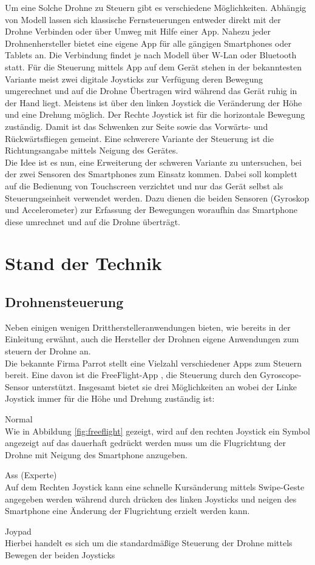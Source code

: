 \documentclass{article}
\begin{document}
Um eine Solche Drohne zu Steuern gibt es verschiedene Möglichkeiten. Abhängig von Modell lassen sich klassische Fernsteuerungen\cite{flypad} entweder direkt mit der Drohne Verbinden oder über Umweg mit Hilfe einer App. Nahezu jeder Drohnenhersteller bietet eine eigene App für alle gängigen Smartphones oder Tablets an. Die Verbindung findet je nach Modell über W-Lan oder Bluetooth statt. Für die Steuerung mittels App auf dem Gerät stehen in der bekanntesten Variante meist zwei digitale Joysticks zur Verfügung deren Bewegung umgerechnet und auf die Drohne Übertragen wird während das Gerät ruhig in der Hand liegt. Meistens ist über den linken Joystick die Veränderung der Höhe und eine Drehung möglich. Der Rechte Joystick ist für die horizontale Bewegung zuständig. Damit ist das Schwenken zur Seite sowie das Vorwärts- und Rückwärtsfliegen gemeint. Eine schwerere Variante der Steuerung ist die Richtungsangabe mittels Neigung des Gerätes.
\\ Die Idee ist es nun, eine Erweiterung der schweren Variante zu untersuchen, bei der zwei Sensoren des Smartphones zum Einsatz kommen. Dabei soll komplett auf die Bedienung von Touchscreen verzichtet und nur das Gerät selbst als Steuerungseinheit verwendet werden. Dazu dienen die beiden Sensoren (Gyroskop und Accelerometer) zur Erfassung der Bewegungen woraufhin das Smartphone diese umrechnet und auf die Drohne überträgt. 

\section{Stand der Technik}
\label{sec:verwandteArbeiten}
\subsection{Drohnensteuerung}
Neben einigen wenigen Drittherstelleranwendungen bieten, wie bereits in der Einleitung erwähnt, auch die Hersteller der Drohnen eigene Anwendungen zum steuern der Drohne an.
\\ Die bekannte Firma Parrot stellt eine Vielzahl verschiedener Apps zum Steuern bereit. Eine davon ist die FreeFlight-App \cite{freeflightapp}, die Steuerung durch den Gyroscope-Sensor unterstützt. Insgesamt bietet sie drei Möglichkeiten an wobei der Linke Joystick immer für die Höhe und Drehung zuständig ist:
\begin{description}
\item Normal \\
Wie in Abbildung \ref{fig:freeflight} gezeigt, wird auf den rechten Joystick ein Symbol angezeigt auf das dauerhaft gedrückt werden muss um die Flugrichtung der Drohne mit Neigung des Smartphone anzugeben.  
\item Ass (Experte) \\ 
Auf dem Rechten Joystick kann eine schnelle Kursänderung mittels Swipe-Geste angegeben werden während durch drücken des linken Joysticks und neigen des Smartphone eine Änderung der Flugrichtung erzielt werden kann. 
\item Joypad\\
Hierbei handelt es sich um die standardmäßige Steuerung der Drohne mittels Bewegen der beiden Joysticks
\end{description}
\end{document}
